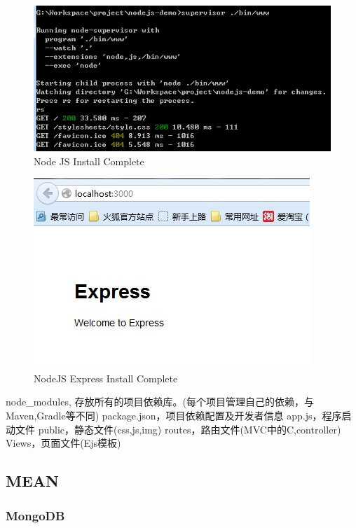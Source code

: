 \documentclass{book}
\begin{document}
\begin{figure}[htbp]
	\centering
	\includegraphics[scale=1]{StartTemplateProject.jpg}
	\caption{Node JS Install Complete}
	\label{fig:StartTemplateProject}
\end{figure}

\begin{figure}[htbp]
	\centering
	\includegraphics[scale=1]{StartPortSuccess.jpg}
	\caption{NodeJS Express Install Complete}
	\label{fig:StartPortSuccess}
\end{figure}


node\_modules, 存放所有的项目依赖库。(每个项目管理自己的依赖，与Maven,Gradle等不同)
package.json，项目依赖配置及开发者信息
app.js，程序启动文件
public，静态文件(css,js,img)
routes，路由文件(MVC中的C,controller)
Views，页面文件(Ejs模板)

\subsection{MEAN}

\subsubsection{MongoDB}
\end{document}
